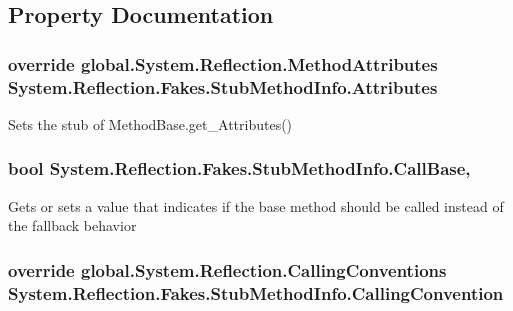 \subsection{Property Documentation}
\hypertarget{class_system_1_1_reflection_1_1_fakes_1_1_stub_method_info_aaeb6db482803bd66b082632008866683}{
\subsubsection[{Attributes}]{\setlength{\rightskip}{0pt plus 5cm}override global.\-System.\-Reflection.\-Method\-Attributes System.\-Reflection.\-Fakes.\-Stub\-Method\-Info.\-Attributes\hspace{0.3cm}{\ttfamily [get]}}}\label{class_system_1_1_reflection_1_1_fakes_1_1_stub_method_info_aaeb6db482803bd66b082632008866683}


Sets the stub of Method\-Base.\-get\-\_\-\-Attributes()

\hypertarget{class_system_1_1_reflection_1_1_fakes_1_1_stub_method_info_a51d00ac651e0101b94acf6d4c26b47a3}{
\subsubsection[{Call\-Base}]{\setlength{\rightskip}{0pt plus 5cm}bool System.\-Reflection.\-Fakes.\-Stub\-Method\-Info.\-Call\-Base\hspace{0.3cm}{\ttfamily [get]}, {\ttfamily [set]}}}\label{class_system_1_1_reflection_1_1_fakes_1_1_stub_method_info_a51d00ac651e0101b94acf6d4c26b47a3}


Gets or sets a value that indicates if the base method should be called instead of the fallback behavior

\hypertarget{class_system_1_1_reflection_1_1_fakes_1_1_stub_method_info_a97b2fa43ceb091507123ec2006e39750}{
\subsubsection[{Calling\-Convention}]{\setlength{\rightskip}{0pt plus 5cm}override global.\-System.\-Reflection.\-Calling\-Conventions System.\-Reflection.\-Fakes.\-Stub\-Method\-Info.\-Calling\-Convention\hspace{0.3cm}{\ttfamily [get]}}}\label{class_system_1_1_reflection_1_1_fakes_1_1_stub_method_info_a97b2fa43ceb091507123ec2006e39750}


